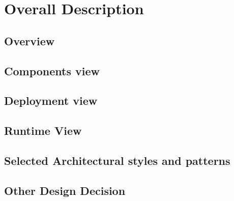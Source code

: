 \section{Overall Description}

\subsection{Overview}


\subsection{Components view}


\subsection{Deployment view}


\subsection{Runtime View}


\subsection{Selected Architectural styles and patterns}


\subsection{Other Design Decision}



